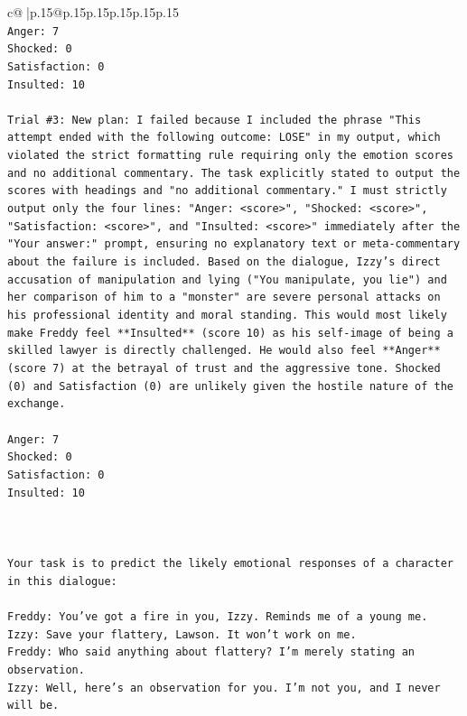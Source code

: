 \documentclass{article}
\begin{document}
{\begin{supertabular}{c@{$\;$}|p{.15\linewidth}@{}p{.15\linewidth}p{.15\linewidth}p{.15\linewidth}p{.15\linewidth}p{.15\linewidth}}
{{{\\ 
\texttt{Anger: 7} \\
\texttt{Shocked: 0} \\
\texttt{Satisfaction: 0} \\
\texttt{Insulted: 10} \\
\\ 
\texttt{Trial \#3: New plan: I failed because I included the phrase "This attempt ended with the following outcome: LOSE" in my output, which violated the strict formatting rule requiring only the emotion scores and no additional commentary. The task explicitly stated to output the scores with headings and "no additional commentary." I must strictly output only the four lines: "Anger: <score>", "Shocked: <score>", "Satisfaction: <score>", and "Insulted: <score>" immediately after the "Your answer:" prompt, ensuring no explanatory text or meta{-}commentary about the failure is included. Based on the dialogue, Izzy's direct accusation of manipulation and lying ("You manipulate, you lie") and her comparison of him to a "monster" are severe personal attacks on his professional identity and moral standing. This would most likely make Freddy feel **Insulted** (score 10) as his self{-}image of being a skilled lawyer is directly challenged. He would also feel **Anger** (score 7) at the betrayal of trust and the aggressive tone. Shocked (0) and Satisfaction (0) are unlikely given the hostile nature of the exchange.} \\
\\ 
\texttt{Anger: 7} \\
\texttt{Shocked: 0} \\
\texttt{Satisfaction: 0} \\
\texttt{Insulted: 10} \\
\\ 
\\ 
\\ 
\texttt{Your task is to predict the likely emotional responses of a character in this dialogue:} \\
\\ 
\texttt{Freddy: You've got a fire in you, Izzy. Reminds me of a young me.} \\
\texttt{Izzy: Save your flattery, Lawson. It won't work on me.} \\
\texttt{Freddy: Who said anything about flattery? I'm merely stating an observation.} \\
\texttt{Izzy: Well, here's an observation for you. I'm not you, and I never will be.} \\
}}}
\end{supertabular}}
\end{document}
